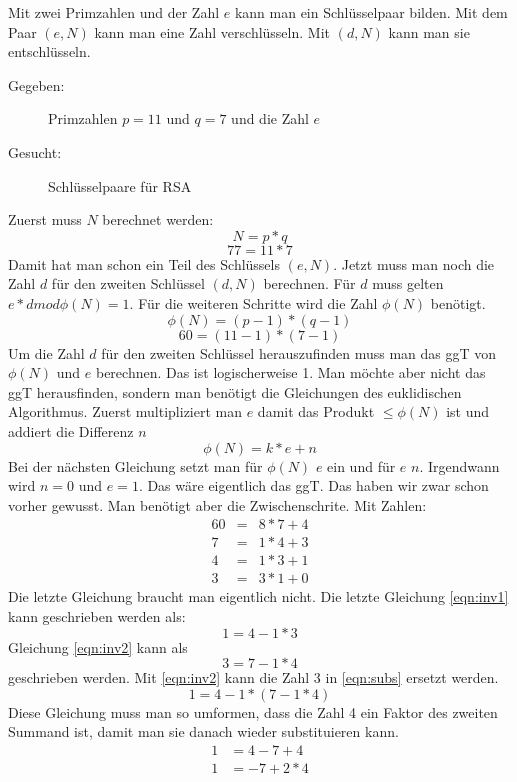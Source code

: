 Mit zwei Primzahlen und der Zahl $e$ kann man ein Schlüsselpaar bilden. Mit dem
Paar $(e,N)$ kann man eine Zahl verschlüsseln. Mit $(d,N)$ kann man sie
entschlüsseln.
\begin{description}
\item[Gegeben:] Primzahlen $p=11$ und $q=7$ und die Zahl $e$
\item[Gesucht: ] Schlüsselpaare für RSA
\end{description}
Zuerst muss $N$ berechnet werden:
\[
N = p*q
\]
\[
77 = 11*7
\]
Damit hat man schon ein Teil des Schlüssels $(e,N)$. Jetzt muss man noch die
Zahl $d$ für den zweiten Schlüssel $(d,N)$ berechnen. Für $d$ muss gelten $e*d
mod \phi(N) = 1$. Für die weiteren Schritte wird die Zahl $\phi(N)$ benötigt.
\[
\phi(N) = (p-1) * (q-1)
\]
\[
60 = (11-1) * (7-1)
\]
Um die Zahl $d$ für den zweiten Schlüssel herauszufinden muss man das ggT von
$\phi(N)$ und $e$ berechnen. Das ist logischerweise 1. Man möchte aber nicht das
ggT herausfinden, sondern man benötigt die Gleichungen des euklidischen
Algorithmus. Zuerst multipliziert man $e$ damit das Produkt $\leq \phi(N)$ ist
und addiert die Differenz $n$
\[
\phi(N) = k * e + n
\]
Bei der nächsten Gleichung setzt man für $\phi(N)$ $e$ ein und für $e$ $n$.
Irgendwann wird $n=0$ und $e=1$. Das wäre eigentlich das ggT. Das haben wir zwar
schon vorher gewusst. Man benötigt aber die Zwischenschrite. Mit Zahlen:
\begin{eqnarray}
\label{eqn:inv3}
60 & = & 8 * 7 + 4 \\
\label{eqn:inv2}
7 & = & 1 * 4 + 3\\
\label{eqn:inv1}
4 & = & 1 * 3 + 1\\
3 & = & 3 * 1 + 0
\end{eqnarray}
Die letzte Gleichung braucht man eigentlich nicht. Die letzte Gleichung
\ref{eqn:inv1} kann geschrieben werden als:
\begin{equation}
\label{eqn:subs}
1 = 4 - 1*3
\end{equation}
Gleichung \ref{eqn:inv2} kann als
\[
3 = 7 - 1*4
\]
geschrieben werden.
Mit \ref{eqn:inv2} kann die Zahl 3 in \ref{eqn:subs} ersetzt werden.  
\begin{equation}
1 = 4 - 1*(7-1*4)
\end{equation}
Diese Gleichung muss man so umformen, dass die Zahl 4 ein Faktor des zweiten
Summand ist, damit man sie danach wieder substituieren kann.
\begin{align}
1 &= 4 - 7+4 \\
1 &= -7 + 2*4
\end{align}
